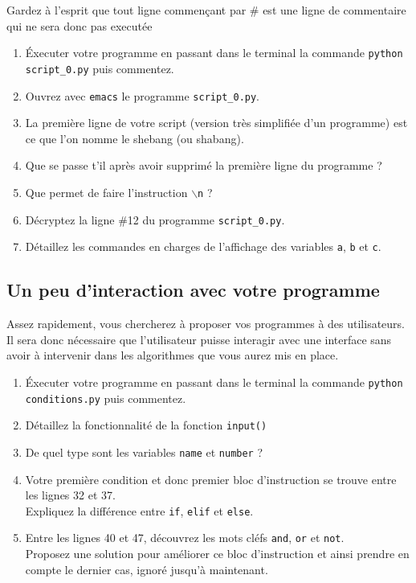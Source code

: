 Gardez à l'esprit que tout ligne commençant par \# est une ligne de commentaire qui ne
sera donc pas executée

\begin{enumerate}
\item Éxecuter votre programme en passant dans le terminal la commande \texttt{python script\_0.py} puis commentez.

\item Ouvrez avec \texttt{emacs} le programme \texttt{script\_0.py}.

\item La première ligne de votre script (version très simplifiée d'un programme)
  est ce que l'on nomme le shebang (ou shabang).

\item Que se passe t'il après avoir supprimé la première ligne du programme ?

\item Que permet de faire l'instruction  \texttt{$\backslash$n} ?

\item Décryptez la ligne \#12 du programme \texttt{script\_0.py}.

\item Détaillez les commandes en charges de l'affichage des variables \texttt{a}, \texttt{b} et \texttt{c}.


\end{enumerate}


\subsection{Un peu d'interaction avec votre programme}


Assez rapidement, vous chercherez à proposer vos programmes à des utilisateurs.
Il sera donc nécessaire que l'utilisateur puisse interagir avec une interface sans avoir à intervenir
dans les algorithmes que vous aurez mis en place.


\begin{enumerate}
\item Éxecuter votre programme en passant dans le terminal la commande \texttt{python conditions.py} puis commentez.

\item Détaillez la fonctionnalité de la fonction \texttt{input()}

\item De quel type sont les variables \texttt{name} et \texttt{number} ?

\item Votre première condition et donc premier bloc d'instruction se trouve entre les lignes 32 et 37.\\
  Expliquez la différence entre \texttt{if}, \texttt{elif} et \texttt{else}.

\item Entre les lignes 40 et 47, découvrez les mots cléfs \texttt{and}, \texttt{or} et \texttt{not}.\\
  Proposez une solution pour améliorer ce bloc d'instruction et ainsi prendre en
  compte le dernier cas, ignoré jusqu'à maintenant.


\end{enumerate}

